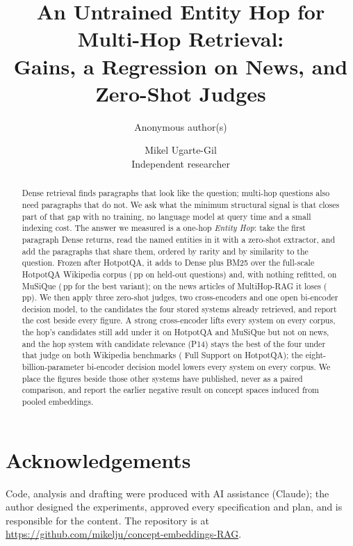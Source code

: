 \documentclass[twocolumn,10pt]{article}
\title{An Untrained Entity Hop for Multi-Hop Retrieval:\\
Gains, a Regression on News, and Zero-Shot Judges}
\author{Anonymous author(s)}
\author{Mikel Ugarte-Gil\\Independent researcher}
\date{}
\newif\ifanonymous
\newcommand{\pp}{\,pp}
\newcommand{\repourl}{\url{https://github.com/mikelju/concept-embeddings-RAG}}
\begin{document}
\maketitle

\begin{abstract}
Dense retrieval finds paragraphs that look like the question; multi-hop questions also need
paragraphs that do not. We ask what the minimum structural signal is that closes part of that
gap with no training, no language model at query time and a small indexing cost. The answer we
measured is a one-hop \emph{Entity Hop}: take the first paragraph Dense returns, read the named
entities in it with a zero-shot extractor, and add the paragraphs that share them, ordered by
rarity and by similarity to the question. Frozen after HotpotQA, it adds to Dense plus BM25 over
the full-scale HotpotQA Wikipedia corpus (\deltaPhTenThree\pp{} on held-out questions) and, with nothing
refitted, on MuSiQue (\deltaPhFifteenPFourteen\pp{} for the best variant); on the news articles of
MultiHop-RAG it loses (\deltaPhSixteenPFourteen\pp). We then apply three zero-shot
judges, two cross-encoders and one open bi-encoder decision model, to the candidates the four
stored systems already retrieved, and report the cost beside every figure. A strong
cross-encoder lifts every system on every corpus, the hop's candidates still add under it on
HotpotQA and MuSiQue but not on news, and the hop system with candidate relevance (P14) stays
the best of the four under that judge on both Wikipedia benchmarks
(\fsPctStrongPFourteenHotpot{} Full Support on HotpotQA); the eight-billion-parameter
bi-encoder decision model lowers every system on every corpus. We place the
figures beside those other systems have published, never as a paired comparison, and report the
earlier negative result on concept spaces induced from pooled embeddings.
\end{abstract}











\ifanonymous\else
\section*{Acknowledgements}
Code, analysis and drafting were produced with AI assistance (Claude); the author designed the
experiments, approved every specification and plan, and is responsible for the content. The
repository is at \repourl.
\fi




\appendix

\end{document}
